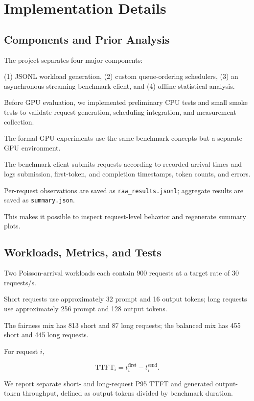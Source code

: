 \documentclass[sigplan,nonacm]{acmart}
\begin{document}
\section{Implementation Details}

\subsection{Components and Prior Analysis}

The project separates four major components:

(1) JSONL workload generation,
(2) custom queue-ordering schedulers,
(3) an asynchronous streaming benchmark client,
and (4) offline statistical analysis.

Before GPU evaluation, we implemented preliminary
CPU tests and small smoke tests to validate
request generation, scheduling integration,
and measurement collection.

The formal GPU experiments use the same benchmark
concepts but a separate GPU environment.

The benchmark client submits requests according
to recorded arrival times and logs submission,
first-token, and completion timestamps,
token counts, and errors.

Per-request observations are saved as
\texttt{raw\_results.jsonl}; aggregate results
are saved as \texttt{summary.json}.

This makes it possible to inspect request-level
behavior and regenerate summary plots.

\subsection{Workloads, Metrics, and Tests}

Two Poisson-arrival workloads each contain
900 requests at a target rate of 30 requests/s.

Short requests use approximately 32 prompt
and 16 output tokens; long requests use
approximately 256 prompt and 128 output tokens.

The fairness mix has 813 short and 87 long
requests; the balanced mix has 455 short
and 445 long requests.

For request $i$,

\begin{equation}
\mathrm{TTFT}_i=
t_i^{\mathrm{first}}-t_i^{\mathrm{send}}.
\end{equation}

We report separate short- and long-request
P95 TTFT and generated output-token throughput,
defined as output tokens divided by benchmark
duration.
\end{document}
